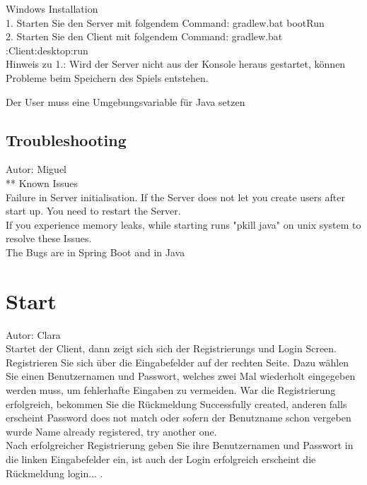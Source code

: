 \documentclass[fontsize=12pt,paper=a4,twoside]{scrartcl}
\begin{document}
Windows Installation \\

1. Starten Sie den Server mit folgendem Command: gradlew.bat bootRun\\
2. Starten Sie den Client mit folgendem Command:  gradlew.bat :Client:desktop:run \\

Hinweis zu 1.: Wird der Server nicht aus der Konsole heraus gestartet, können Probleme beim Speichern
des Spiels entstehen.

Der User muss eine Umgebungsvariable für Java setzen

\subsection{Troubleshooting}
Autor: Miguel\\

** Known Issues\\
Failure in Server initialisation. If the Server does not let you create users after start up. You need to restart the Server.\\
If you experience memory leaks, while starting runs "pkill java" on unix system to resolve these Issues.\\
The Bugs are in Spring Boot and in Java\\



\section{Start}
Autor: Clara\\

Startet der Client, dann zeigt sich sich der Registrierungs und Login Screen.
Registrieren Sie sich über die Eingabefelder auf der rechten Seite. Dazu wählen Sie einen Benutzernamen und Passwort, welches zwei Mal wiederholt eingegeben werden muss, um fehlerhafte Eingaben zu vermeiden.
War die Registrierung erfolgreich, bekommen Sie die Rückmeldung Successfully created, anderen falls erscheint Password does not match oder sofern der Benutzname schon vergeben wurde Name already
registered, try another one.\\
Nach erfolgreicher Registrierung geben Sie ihre Benutzernamen und Passwort in die linken Eingabefelder ein, ist auch der Login erfolgreich erscheint die Rückmeldung login... .\\
\end{document}
